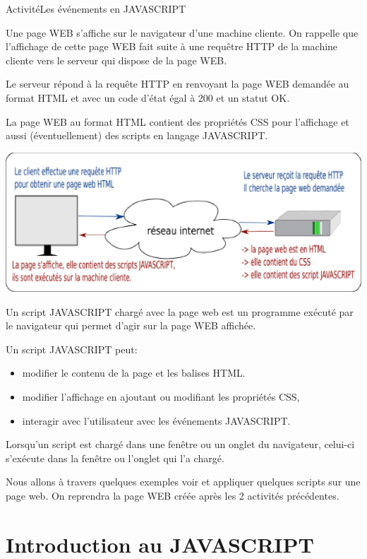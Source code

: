 \documentclass[12pt,a4paper]{article}
\begin{document}
\begin{NSI}
{Activité}{Les événements en JAVASCRIPT}
\end{NSI}

Une page WEB s'affiche sur le navigateur d'une machine cliente. On rappelle que l'affichage de cette page WEB fait suite à une requêtre HTTP de la machine cliente vers le serveur qui dispose de la page WEB.

Le serveur répond à la requête HTTP en renvoyant la page WEB demandée au format HTML et avec un code d'état égal à 200 et un statut \textsf{OK}.

La page WEB au format HTML contient des propriétés CSS pour l'affichage et aussi (éventuellement) des scripts en langage JAVASCRIPT.

\begin{center}
\includegraphics[scale=0.8]{img/requete_http.eps}
\end{center}

Un script JAVASCRIPT chargé avec la page web est un programme exécuté par le navigateur qui permet d'agir sur la page WEB affichée.

Un script JAVASCRIPT peut:
\begin{itemize}[label=\textbullet]
\item modifier le contenu de la page et les balises HTML.
\item modifier l'affichage en ajoutant ou modifiant les propriétés CSS,
\item interagir avec l'utilisateur avec les événements JAVASCRIPT.
\end{itemize}

Lorsqu'un script est chargé dans une fenêtre ou un onglet du navigateur, celui-ci s'exécute dans la fenêtre ou l'onglet qui l'a chargé.


Nous allons à travers quelques exemples voir et appliquer quelques scripts sur une page web. On reprendra la page WEB créée après les 2 activités précédentes.


\newpage
\section*{Introduction au JAVASCRIPT}
\end{document}
